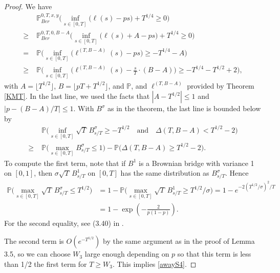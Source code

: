 \begin{proof}
	We have
	\begin{align*}
	& \mathbb{P}^{0,T,x,y}_{Ber}\Big( \inf_{s \in [0,T]} \big( \ell(s) -ps \big)+ T^{1/4} \geq 0 \Big) \\
	\geq \; & \mathbb{P}^{0,T,0,B-A}_{Ber}\Big( \inf_{s \in [0,T]} \big( \ell(s) + A -ps \big)+ T^{1/4} \geq 0 \Big)\\
	= \; & \mathbb{P}\Big( \inf_{s \in [0,T]} \big( \ell^{(T,B-A)}(s) -ps \big) \geq - T^{1/4} - A \Big)\\
	\geq \; & \mathbb{P}\Big( \inf_{s \in [0,T]} \big( \ell^{(T,B-A)}(s) - \frac{s}{T}\cdot(B-A) \big) \geq - T^{1/4} - T^{1/2} + 2 \Big),
	\end{align*}
	with $A = \lfloor T^{1/2}\rfloor$, $B = \lfloor pT + T^{1/2}\rfloor$, and $\mathbb{P}$, and $\ell^{(T,B-A)}$ provided by Theorem \ref{KMT}. In the last line, we used the facts that $|A-T^{1/2}|\leq 1$ and $|p-(B-A)/T|\leq 1$. With $B^\sigma$ as in the theorem, the last line is bounded below by
	\begin{align*}
	&\mathbb{P}\Big( \inf_{s\in[0,T]} \sqrt{T}\,B^\sigma_{s/T} \geq - T^{1/2} \quad \mathrm{and} \quad \Delta(T,B-A) < T^{1/2} - 2 \Big)\\
	\geq \; & \mathbb{P}\Big( \max_{s\in[0,T]} B^\sigma_{s/T} \leq 1 \Big) - \mathbb{P}\Big( \Delta(T,B-A) \geq T^{1/2} - 2 \Big).
	\end{align*}
	To compute the first term, note that if $B^1$ is a Brownian bridge with variance 1 on $[0,1]$, then $\sigma \sqrt{T}\,B^1_{s/T}$ on $[0,T]$ has the same distribution as $B^\sigma_{s/T}$. Hence
	\begin{align*}
	\mathbb{P}\Big( \max_{s\in[0,T]} \sqrt{T}\,B^\sigma_{s/T} \leq T^{1/2} \Big) &= 1 - \mathbb{P}\Big( \max_{s\in[0,T]} \sqrt{T}\,B^1_{s/T} \geq T^{1/2}/\sigma \Big) = 1 - e^{-2(T^{1/2}/\sigma)^2/T}\\ 
	&= 1- \exp\left(-\frac{2}{p(1-p)}\right).
	\end{align*}
	For the second equality, see (3.40) in \cite[Chapter 4]{KS}.
	
	The second term is $O(e^{-T^{1/2}})$ by the same argument as in the proof of Lemma 3.5, so we can choose $W_3$ large enough depending on $p$ so that this term is less than 1/2 the first term for $T\geq W_3$. This implies \eqref{awayS4}.
\end{proof}


